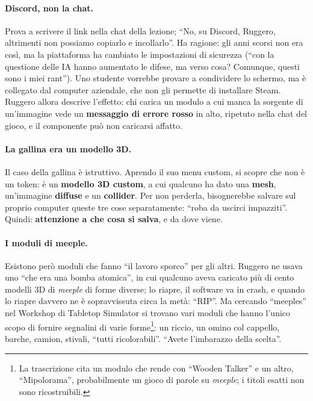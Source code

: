 \paragraph{Discord, non la chat.} Prova a scrivere il link nella chat della lezione;
``No, su Discord, Ruggero, altrimenti non possiamo copiarlo e incollarlo''. Ha ragione:
gli anni scorsi non era così, ma la piattaforma ha cambiato le impostazioni di
sicurezza (``con la questione delle IA hanno aumentato le difese, ma verso cosa?
Comunque, questi sono i miei rant''). Uno studente vorrebbe provare a condividere lo
schermo, ma è collegato dal computer aziendale, che non gli permette di installare
Steam. Ruggero allora descrive l'effetto: chi carica un modulo a cui manca la sorgente
di un'immagine vede un \textbf{messaggio di errore rosso} in alto, ripetuto nella chat
del gioco, e il componente può non caricarsi affatto.

\paragraph{La gallina era un modello 3D.} Il caso della gallina è istruttivo. Aprendo
il suo menu custom, si scopre che non è un token: è un \textbf{modello 3D custom}, a cui
qualcuno ha dato una \textbf{mesh}, un'immagine \textbf{diffuse} e un \textbf{collider}.
Per non perderla, bisognerebbe salvare sul proprio computer queste tre cose
separatamente: ``roba da uscirci impazziti''. Quindi: \textbf{attenzione a che cosa si
salva}, e da dove viene.

\paragraph{I moduli di meeple.} Esistono però moduli che fanno ``il lavoro sporco'' per
gli altri. Ruggero ne usava uno ``che era una bomba atomica'', in cui qualcuno aveva
caricato più di cento modelli 3D di \emph{meeple} di forme diverse; lo riapre, il
software va in crash, e quando lo riapre davvero ne è sopravvissuta circa la metà:
``RIP''. Ma cercando ``meeples'' nel Workshop di Tabletop Simulator si trovano vari
moduli che hanno l'unico scopo di fornire segnalini di varie forme\footnote{La
trascrizione cita un modulo che rende con ``Wooden Talker'' e un altro, ``Mipolorama'',
probabilmente un gioco di parole su \emph{meeple}; i titoli esatti non sono
ricostruibili.}: un riccio, un omino col cappello, barche, camion, stivali, ``tutti
ricolorabili''. ``Avete l'imbarazzo della scelta''.

